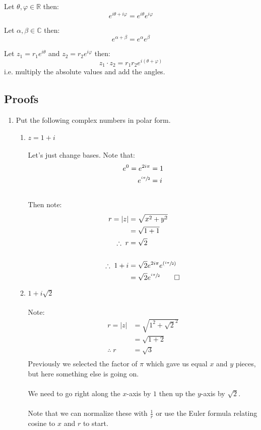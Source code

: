 \begin{thm}
	Let $\theta, \varphi \in \mathbb{R}$ then:
	\[e^{i\theta + i\varphi} = e^{i\theta}e^{i\varphi}\]
\end{thm}
\begin{thm}
	Let $\alpha, \beta \in \mathbb{C}$ then:
	\[e^{\alpha + \beta} = e^{\alpha}e^{\beta}\]
\end{thm}
\begin{thm}
	Let $z_1 = r_1 e^{i\theta}$ and $z_2 = r_2 e^{i\varphi}$ then:
	\[z_1 \cdot z_2 = r_1 r_2 e^{i(\theta + \varphi)} \]
	i.e. multiply the absolute values and add the angles.
\end{thm}
\subsection{Proofs}
\begin{enumerate}
	\item Put the following complex numbers in polar form.
	\begin{enumerate}
		\item $z = 1 + i$ \\
		\\ 
		Let's just change bases. Note that:
		\begin{align*}
			e^0 = e^{2i\pi} &= 1 \\
			e^{\sfrac{i\pi}{2}} &= i\\
		\end{align*} 
		\\
		Then note:
		\begin{align*}
			r = |z| &= \sqrt{x^2 + y^2} \\ 
			&= \sqrt{1 + 1} \\ 
			\therefore \; r &= \sqrt{2} \\
			\\
			\therefore \; 1 + i &= \sqrt{2} e^{2i\pi} e^{(\sfrac{i\pi}{2})} \\
			&= \sqrt{2}e^{\sfrac{i\pi}{2}} \qed
		\end{align*}
		\item $1 + i\sqrt{2}$ \\
		\\
		Note:
		\begin{align*}
			r = |z| &= \sqrt{1^2 + \sqrt{2}^2} \\
			&= \sqrt{1 + 2} \\
			\therefore \; r &= \sqrt{3}\\
		\end{align*}
		Previously we selected the factor of $\pi$ which gave us equal $x$ and $y$ pieces, but here something else is going on. \\
		\\
		We need to go right along the $x$-axis by $1$ then up the $y$-axis by $\sqrt{2}.$ \\
		\\
		Note that we can normalize these with $\frac{1}{r}$ or use the Euler formula relating cosine to $x$ and $r$ to start. \\
		

\end{enumerate}
\end{enumerate}
